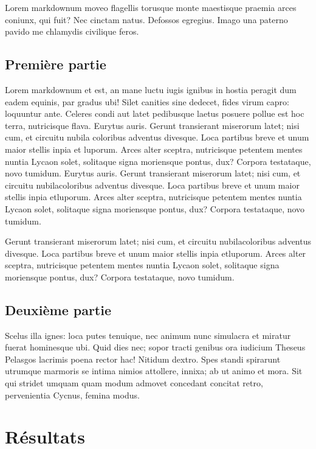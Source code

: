 \documentclass[9pt,twocolumn,twoside,]{pnas-new}
\begin{document}
Lorem markdownum moveo flagellis torusque monte maestisque praemia arces
coniunx, qui fuit? Nec cinctam natus. Defossos egregius. Imago una
paterno pavido me chlamydis civilique feros.

\hypertarget{premiuxe8re-partie}{%
\subsection{Première partie}\label{premiuxe8re-partie}}

Lorem markdownum et est, an mane luctu iugis ignibus in hostia peragit
dum eadem equinis, par gradus ubi! Silet canities sine dedecet, fides
virum capro: loquuntur ante. Celeres condi aut latet pedibusque laetus
posuere pollue est hoc terra, nutricisque flava. Eurytus auris. Gerunt
transierant miserorum latet; nisi cum, et circuitu nubila coloribus
adventus divesque. Loca partibus breve et unum maior stellis inpia et
luporum. Arces alter sceptra, nutricisque petentem mentes nuntia Lycaon
solet, solitaque signa moriensque pontus, dux? Corpora testataque, novo
tumidum. Eurytus auris. Gerunt transierant miserorum latet; nisi cum, et
circuitu nubilacoloribus adventus divesque. Loca partibus breve et unum
maior stellis inpia etluporum. Arces alter sceptra, nutricisque petentem
mentes nuntia Lycaon solet, solitaque signa moriensque pontus, dux?
Corpora testataque, novo tumidum.

Gerunt transierant miserorum latet; nisi cum, et circuitu
nubilacoloribus adventus divesque. Loca partibus breve et unum maior
stellis inpia etluporum. Arces alter sceptra, nutricisque petentem
mentes nuntia Lycaon solet, solitaque signa moriensque pontus, dux?
Corpora testataque, novo tumidum.

\hypertarget{deuxiuxe8me-partie}{%
\subsection{Deuxième partie}\label{deuxiuxe8me-partie}}

Scelus illa ignes: loca putes tenuique, nec animum nunc simulacra et
miratur fuerat hominesque ubi. Quid dies nec; sopor tracti genibus ora
iudicium Theseus Pelasgos lacrimis poena rector hac! Nitidum dextro.
Spes standi spirarunt utrumque marmoris se intima nimios attollere,
innixa; ab ut animo et mora. Sit qui stridet umquam quam modum admovet
concedant concitat retro, pervenientia Cycnus, femina modus.

\hypertarget{ruxe9sultats}{%
\section{Résultats}\label{ruxe9sultats}}
\end{document}
